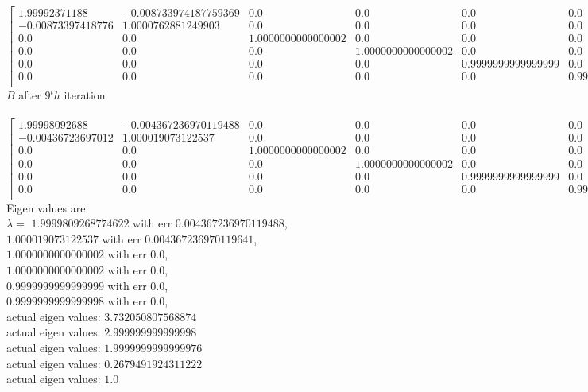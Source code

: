 \documentclass[12pt]{article}
\begin{document}
$
\left[ {\begin{array}{cccccc}
1.99992371188 & -0.008733974187759369 & 0.0 & 0.0 & 0.0 & 0.0 \\
-0.00873397418776 & 1.0000762881249903 & 0.0 & 0.0 & 0.0 & 0.0 \\
0.0 & 0.0 & 1.0000000000000002 & 0.0 & 0.0 & 0.0 \\
0.0 & 0.0 & 0.0 & 1.0000000000000002 & 0.0 & 0.0 \\
0.0 & 0.0 & 0.0 & 0.0 & 0.9999999999999999 & 0.0 \\
0.0 & 0.0 & 0.0 & 0.0 & 0.0 & 0.9999999999999998 \\
\end{array} } \right]
$
\\
$B$ after $9^th$ iteration \\
\\
$
\left[ {\begin{array}{cccccc}
1.99998092688 & -0.004367236970119488 & 0.0 & 0.0 & 0.0 & 0.0 \\
-0.00436723697012 & 1.000019073122537 & 0.0 & 0.0 & 0.0 & 0.0 \\
0.0 & 0.0 & 1.0000000000000002 & 0.0 & 0.0 & 0.0 \\
0.0 & 0.0 & 0.0 & 1.0000000000000002 & 0.0 & 0.0 \\
0.0 & 0.0 & 0.0 & 0.0 & 0.9999999999999999 & 0.0 \\
0.0 & 0.0 & 0.0 & 0.0 & 0.0 & 0.9999999999999998 \\
\end{array} } \right]
$
\\
Eigen values are \\
$\lambda = $
$1.9999809268774622$ with err $0.004367236970119488$,\\
$1.000019073122537$ with err $0.004367236970119641$,\\
$1.0000000000000002$ with err $0.0$,\\
$1.0000000000000002$ with err $0.0$,\\
$0.9999999999999999$ with err $0.0$,\\
$0.9999999999999998$ with err $0.0$,\\
actual eigen values: $3.732050807568874$\\
actual eigen values: $2.999999999999998$\\
actual eigen values: $1.9999999999999976$\\
actual eigen values: $0.2679491924311222$\\
actual eigen values: $1.0$\\
\end{document}
